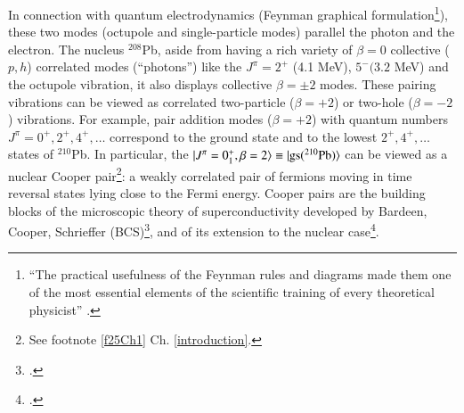 In connection with quantum electrodynamics (Feynman graphical formulation\footnote{\label{f2C2}``The practical usefulness of the Feynman rules and diagrams made them one of the most essential elements of the scientific training of every theoretical physicist'' \citep{Mehra:96}.}),  these two modes (octupole and single-particle modes) parallel the photon and the electron. The nucleus $^{208}$Pb, aside from having a rich variety of $\beta=0$ collective ($p,h$) correlated modes (``photons'') like the $J^\pi=2^+$ (4.1 MeV), $5^-(3.2$ MeV) and the octupole vibration, it also displays collective $\beta=\pm2$ modes. These pairing vibrations can be viewed as correlated two-particle ($\beta=+2$) or two-hole ($\beta=-2$) vibrations. For example, pair addition modes ($\beta=+2$) with quantum numbers $J^\pi=0^+,2^+,4^+,\dots$ correspond to the ground state and to the lowest $2^+,4^+,\dots$ states of $^{210}$Pb. In particular,  the $|{J^\pi=0^+_1,\beta=2} \rangle\equiv |{\text{gs}(^{210}\text{Pb})} \rangle$ can be viewed as a nuclear  Cooper pair\footnote{See footnote \ref{f25Ch1} Ch. \ref{introduction}.}: a weakly correlated pair of fermions moving in time reversal states lying close to the Fermi energy. Cooper pairs are the building blocks of the microscopic theory of superconductivity developed by Bardeen, Cooper, Schrieffer (BCS)\footnote{\cite{Bardeen:57a,Bardeen:57b}.}, and of its extension to the nuclear case\footnote{\cite{Bohr:58}.}.


